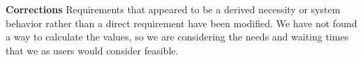 \noindent\textbf{Corrections} Requirements that appeared to be a derived necessity or system behavior rather than a direct requirement have been modified. We have not found a way to calculate the values, so we are considering the needs and waiting times that we as users would consider feasible.

\newpage